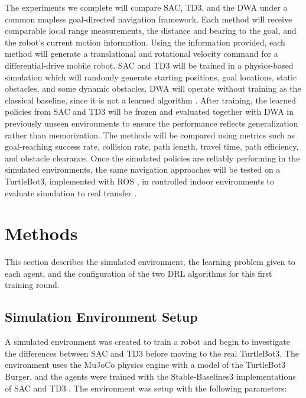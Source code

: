 \documentclass[conference, 11pt]{IEEEtran}
\begin{document}
The experiments we complete will compare SAC, TD3, and the DWA under a common mapless goal-directed navigation framework.
Each method will receive comparable local range measurements, the distance and bearing to the goal, and the robot's current motion information.
Using the information provided, each method will generate a translational and rotational velocity command for a differential-drive mobile robot. 
SAC and TD3 will be trained in a physics-based simulation which will randomly generate starting positions, goal locations, static obstacles, and some dynamic obstacles. 
DWA will operate without training as the classical baseline, since it is not a learned algorithm \cite{Fox_Burgand}.
After training, the learned policies from SAC and TD3 will be frozen and evaluated together with DWA in previously unseen environments to ensure the performance reflects generalization rather than memorization.
The methods will be compared using metrics such as goal-reaching success rate, collision rate, path length, travel time, path efficiency, and obstacle clearance.
Once the simulated policies are reliably performing in the simulated environments, the same navigation approaches will be tested on a TurtleBot3, implemented with ROS \cite{ros-open-source-operating-system}, in controlled indoor environments to evaluate simulation to real transfer \cite{Tai_Lei} \cite{Yan_2D}.

\section{Methods}
This section describes the simulated environment, the learning problem given to each agent, and the configuration of the two DRL algorithms for this first training round.

\subsection{Simulation Environment Setup}

A simulated environment was created to train a robot and begin to investigate the differences between SAC and TD3 before moving to the real TurtleBot3. The environment uses the MuJoCo physics engine \cite{Todorov_MuJoCo} with a model of the TurtleBot3 Burger, and the agents were trained with the Stable-Baselines3 implementations of SAC and TD3 \cite{Raffin_SB3}. The environment was setup with the following parameters:
\end{document}
